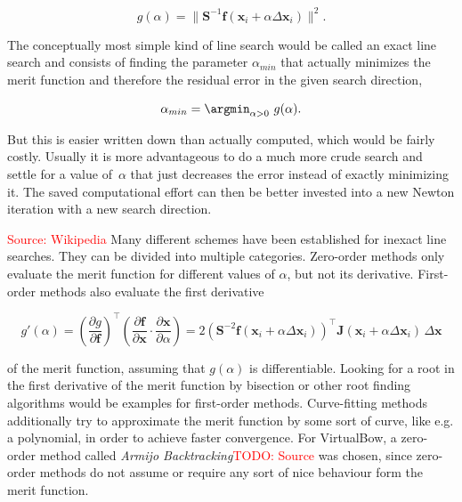 \begin{equation}
g(\alpha) = \lVert \boldsymbol{S}^{-1}\boldsymbol{f}(\boldsymbol{x}_{i} + \alpha\Delta\boldsymbol{x}_{i}) \rVert^2.
\end{equation}

The conceptually most simple kind of line search would be called an exact line search and consists of finding the parameter $\alpha_{min}$ that actually minimizes the merit function and therefore the residual error in the given search direction,

\begin{equation}
\alpha_{min} = \argmin_{\alpha > 0}\ g(\alpha).
\end{equation}

But this is easier written down than actually computed, which would be fairly costly.
Usually it is more advantageous to do a much more crude search and settle for a value of~$\alpha$ that just decreases the error instead of exactly minimizing it.
The saved computational effort can then be better invested into a new Newton iteration with a new search direction.

\textcolor{red}{Source: Wikipedia}
Many different schemes have been established for inexact line searches.
They can be divided into multiple categories.
Zero-order methods only evaluate the merit function for different values of $\alpha$, but not its derivative.
First-order methods also evaluate the first derivative

\begin{equation}
g'(\alpha) = \left(\frac{\partial g}{\partial \boldsymbol{f}}\right)^\intercal\left(\frac{\partial \boldsymbol{f}}{\partial \boldsymbol{x}} \cdot \frac{\partial \boldsymbol{x}}{\partial \alpha}\right) = 2\left(\boldsymbol{S}^{-2}\boldsymbol{f}(\boldsymbol{x}_{i} + \alpha\Delta\boldsymbol{x}_{i})\right)^\intercal\boldsymbol{J}(\boldsymbol{x}_{i} + \alpha\Delta\boldsymbol{x}_{i})\,\Delta\boldsymbol{x}
\end{equation}

of the merit function, assuming that $g(\alpha)$ is differentiable.
Looking for a root in the first derivative of the merit function by bisection or other root finding algorithms would be examples for first-order methods.
Curve-fitting methods additionally try to approximate the merit function by some sort of curve, like e.g. a polynomial, in order to achieve faster convergence.
For VirtualBow, a zero-order method called \textit{Armijo Backtracking}\textcolor{red}{TODO: Source} was chosen, since zero-order methods do not assume or require any sort of nice behaviour form the merit function.

